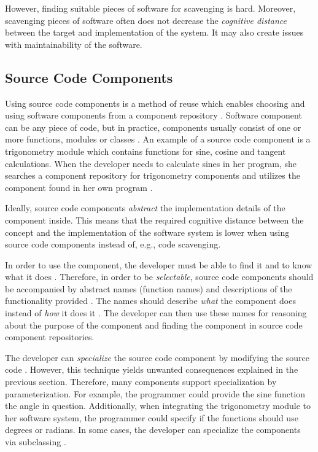 However, finding suitable pieces of software for scavenging is hard. Moreover, scavenging pieces of software often does not decrease the \emph{cognitive distance} between the target and implementation of the system. It may also create issues with maintainability of the software. \citep[chap.~4]{krueger_software_1992}

\subsection{Source Code Components}

Using source code components is a method of reuse which enables choosing and using software components from a component repository \citep[chap.~3]{sametinger_software_1997}. Software component can be any piece of code, but in practice, components usually consist of one or more functions, modules or classes \citep[chap.~3]{sametinger_software_1997}. An example of a source code component is a trigonometry module which contains functions for sine, cosine and tangent calculations. When the developer needs to calculate sines in her program, she searches a component repository for trigonometry components and utilizes the component found in her own program \citep[chap.~5]{krueger_software_1992}.

Ideally, source code components \emph{abstract} the implementation details of the component inside. This means that the required cognitive distance between the concept and the implementation of the software system is lower when using source code components instead of, e.g., code scavenging. 

In order to use the component, the developer must be able to find it and to know what it does \citep[chap.~5]{krueger_software_1992}. Therefore, in order to be \emph{selectable}, source code components should be accompanied by abstract names (function names) and descriptions of the functionality provided \citep[chap.~5]{krueger_software_1992}. The names should describe \emph{what} the component does instead of \emph{how} it does it \citep[chap.~5]{krueger_software_1992}. The developer can then use these names for reasoning about the purpose of the component and finding the component in source code component repositories.

The developer can \emph{specialize} the source code component by modifying the source code \citet[chap.~5]{krueger_software_1992}. However, this technique yields unwanted consequences explained in the previous section. Therefore, many components support specialization by parameterization. For example, the programmer could provide the sine function the angle in question. Additionally, when integrating the trigonometry module to her software system, the programmer could specify if the functions should use degrees or radians. In some cases, the developer can specialize the components via subclassing \citep[chap.~5]{krueger_software_1992}.

